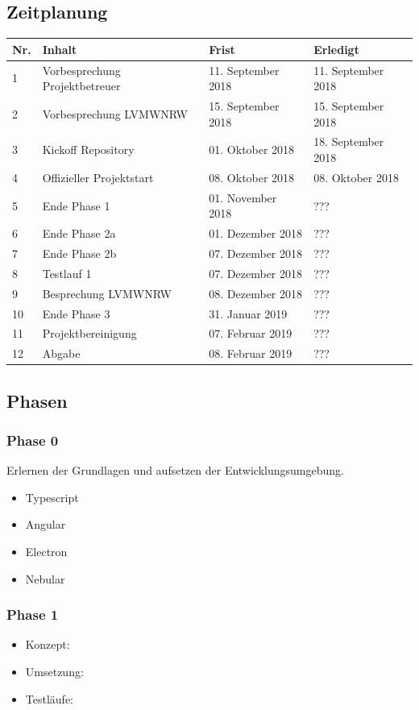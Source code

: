 \documentclass[a4paper]{scrartcl}
\begin{document}
\subsection{Zeitplanung}
\begin{tabularx}{\textwidth}{|l|X|l|l|}
	\hline
	Nr. & Inhalt & Frist & Erledigt \\ \hline
	1 & Vorbesprechung Projektbetreuer & 11. September 2018 & 11. September 2018 \\ \hline
	2 & Vorbesprechung LVMWNRW & 15. September 2018 & 15. September 2018 \\ \hline
	3 & Kickoff Repository & 01. Oktober 2018 & 18. September 2018 \\ \hline
	4 & Offizieller Projektstart & 08. Oktober 2018 & 08. Oktober 2018 \\ \hline
	5 & Ende Phase 1 & 01. November 2018 & ??? \\ \hline
	6 & Ende Phase 2a & 01. Dezember 2018 & ??? \\ \hline
	7 & Ende Phase 2b & 07. Dezember 2018 & ??? \\ \hline
	8 & Testlauf 1 & 07. Dezember 2018 & ??? \\ \hline
	9 & Besprechung LVMWNRW & 08. Dezember 2018 & ??? \\ \hline
	10 & Ende Phase 3 & 31. Januar 2019 & ??? \\ \hline
	11 & Projektbereinigung & 07. Februar 2019 & ??? \\ \hline
	12 & Abgabe & 08. Februar 2019 & ??? \\ \hline
\end{tabularx}

\subsection{Phasen}
\subsubsection{Phase 0}
	Erlernen der Grundlagen und aufsetzen der Entwicklungsumgebung.
	
	\begin{itemize}
		\item Typescript
		\item Angular
		\item Electron
		\item Nebular
	\end{itemize}

\subsubsection{Phase 1}
	\begin{itemize}
		\item Konzept:
		\item Umsetzung:
		\item Testläufe:
	\end{itemize}
	
\end{document}
